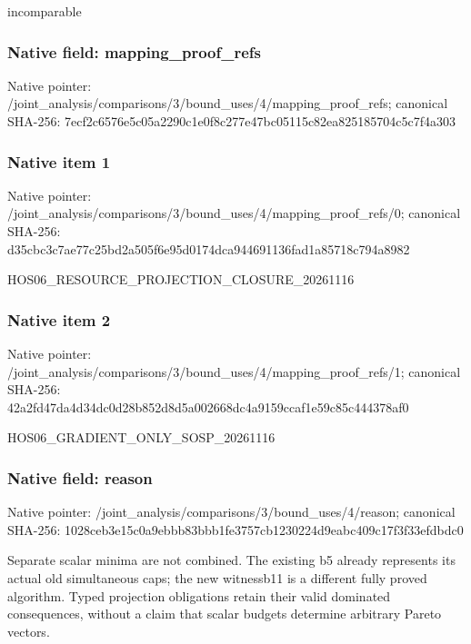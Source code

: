 \documentclass[10pt,a4paper]{article}
\begin{document}
\begingroup\raggedright\sloppy incomparable\par\endgroup

\subsubsection{Native field: mapping\_\allowbreak{}proof\_\allowbreak{}refs}
Native pointer: /joint\_\allowbreak{}analysis/comparisons/3/bound\_\allowbreak{}uses/4/mapping\_\allowbreak{}proof\_\allowbreak{}refs; canonical SHA-256: 7ecf2c6576e5c05a2290c1e0f8c277e47bc05115c82ea825185704c5c7f4a303

\subsubsection{Native item 1}
Native pointer: /joint\_\allowbreak{}analysis/comparisons/3/bound\_\allowbreak{}uses/4/mapping\_\allowbreak{}proof\_\allowbreak{}refs/0; canonical SHA-256: d35cbc3c7ae77c25bd2a505f6e95d0174dca944691136fad1a85718c794a8982

\begingroup\raggedright\sloppy HOS06\_\allowbreak{}RESOURCE\_\allowbreak{}PROJECTION\_\allowbreak{}CLOSURE\_\allowbreak{}20261116\par\endgroup

\subsubsection{Native item 2}
Native pointer: /joint\_\allowbreak{}analysis/comparisons/3/bound\_\allowbreak{}uses/4/mapping\_\allowbreak{}proof\_\allowbreak{}refs/1; canonical SHA-256: 42a2fd47da4d34dc0d28b852d8d5a002668dc4a9159ccaf1e59c85c444378af0

\begingroup\raggedright\sloppy HOS06\_\allowbreak{}GRADIENT\_\allowbreak{}ONLY\_\allowbreak{}SOSP\_\allowbreak{}20261116\par\endgroup

\subsubsection{Native field: reason}
Native pointer: /joint\_\allowbreak{}analysis/comparisons/3/bound\_\allowbreak{}uses/4/reason; canonical SHA-256: 1028ceb3e15c0a9ebbb83bbb1fe3757cb1230224d9eabc409c17f3f33efdbdc0

\begingroup\raggedright\sloppy Separate scalar minima are not combined. The existing b5 already represents its actual old simultaneous caps;\allowbreak{} the new witnessb11 is a different fully proved algorithm. Typed projection obligations retain their valid dominated consequences,\allowbreak{} without a claim that scalar budgets determine arbitrary Pareto vectors.\par\endgroup
\end{document}
